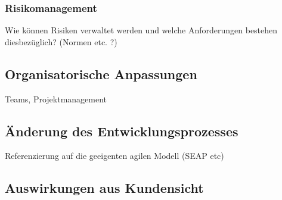 \subsubsection{Risikomanagement}

Wie können Risiken verwaltet werden und welche Anforderungen bestehen diesbezüglich? (Normen etc. ?)

\subsection{Organisatorische Anpassungen}

Teams, Projektmanagement

\subsection{Änderung des Entwicklungsprozesses}

Referenzierung auf die geeigenten agilen Modell (SEAP etc)

\subsection{Auswirkungen aus Kundensicht}




